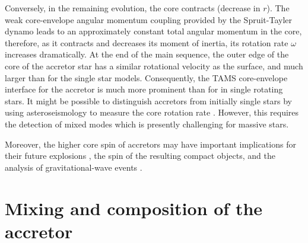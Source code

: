 \documentclass[twocolumn,twocolappendix,trackchanges]{aastex63}
\begin{document}
Conversely, in the remaining evolution, the core contracts (decrease
in $r$). The weak core-envelope angular momentum coupling provided by
the Spruit-Tayler dynamo leads to an approximately constant total
angular momentum in the core, therefore, as it contracts and decreases
its moment of inertia, its rotation rate $\omega$ increases
dramatically.  At the end of the main sequence, the outer edge of the
core of the accretor star has a similar rotational velocity as the
surface, and much larger than for the single star models.
Consequently, the TAMS core-envelope interface
for the accretor is much more prominent than for in single rotating
stars. It might be possible to distinguish accretors from
initially single stars by using asteroseismology to measure the core
rotation rate \citep[e.g.,][]{cantiello:14}. However, this requires
the detection of mixed modes which is presently challenging for
massive stars.

Moreover, the higher core spin of accretors may have
important implications for their future explosions
\citep[e.g.][]{macfadyen:99, cantiello:07}, the spin of the
resulting compact objects, and the analysis of gravitational-wave
events \citep[e.g.,][]{zaldarriaga:18, qin:18, callister:21}.

\section{Mixing and composition of the accretor}
\label{sec:mixing}
\end{document}
